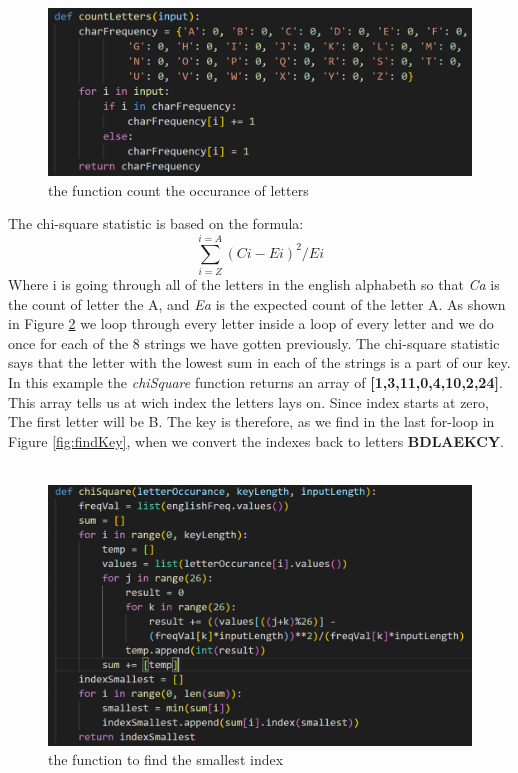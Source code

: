 \documentclass[12pt, letterpaper]{article}
\begin{document}
\begin{figure}[H]
  \includegraphics[width=\linewidth]{code_snippets/countLetters.PNG}
  \caption{the function count the occurance of letters}
  \label{fig:countLetters}
\end{figure}

The chi-square statistic is based on the formula: 
$$\sum_{i = Z}^{i = A} (Ci - Ei)^{2}/Ei $$
Where i is going through all of the letters in the english alphabeth so that \textit{Ca} is the count of letter the A, and \textit{Ea} is the expected count of the letter A. As shown in Figure \ref{fig:chiSquare} we loop through every letter inside a loop of every letter and we do once for each of the 8 strings we have gotten previously. The chi-square statistic says that the letter with the lowest sum in each of the strings is a part of our key. In this example the \textit{chiSquare} function returns an array of \textbf{[1,3,11,0,4,10,2,24]}. This array tells us at wich index the letters lays on. Since index starts at zero, The first letter will be B. The key is therefore, as we find in the last for-loop in Figure \ref{fig:findKey}, when we convert the indexes back to letters \textbf{BDLAEKCY}. \\ \\

\begin{figure}[H]
  \includegraphics[width=\linewidth]{code_snippets/chiSquare.PNG}
  \caption{the function to find the smallest index}
  \label{fig:chiSquare}
\end{figure}
\end{document}

